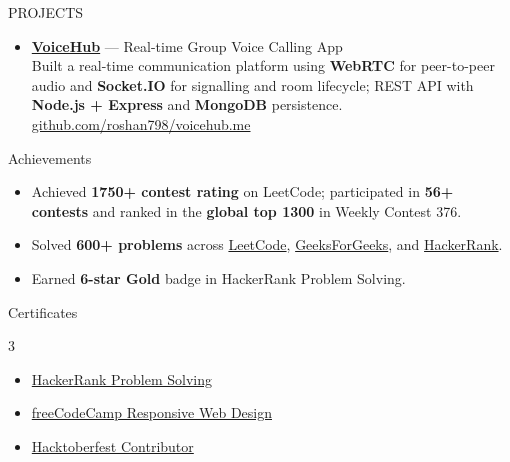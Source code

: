 \documentclass{resume}
\begin{document}
\begin{rSection}{PROJECTS}
\begin{itemize}
\item \href{https://github.com/roshan798/voicehub.me}{\textbf{VoiceHub}}
  --- Real-time Group Voice Calling App\\
  Built a real-time communication platform using \textbf{WebRTC} for
  peer-to-peer audio and \textbf{Socket.IO} for signalling and room lifecycle;
  REST API with \textbf{Node.js + Express} and \textbf{MongoDB} persistence.\\
  \href{https://github.com/roshan798/voicehub.me}{github.com/roshan798/voicehub.me}

\end{itemize}
\end{rSection}


\begin{rSection}{Achievements}
\begin{itemize}
  \item Achieved \textbf{1750+ contest rating} on LeetCode; participated in
        \textbf{56+ contests} and ranked in the \textbf{global top 1300}
        in Weekly Contest 376.
  \item Solved \textbf{600+ problems} across
        \href{https://leetcode.com/u/Roshan_kumar7989/}{LeetCode},
        \href{https://auth.geeksforgeeks.org/user/roshan_sahu/}{GeeksForGeeks}, and
        \href{https://www.hackerrank.com/rsahu7989}{HackerRank}.
  \item Earned \textbf{6-star Gold} badge in HackerRank Problem Solving.
\end{itemize}
\end{rSection}


\begin{rSection}{Certificates}
\begin{multicols}{3}
\begin{itemize}
  \item \href{https://www.hackerrank.com/certificates/73bb80c83be4}{HackerRank Problem Solving}
  \item \href{https://www.freecodecamp.org/certification/Roshan_kumar7989/responsive-web-design}{freeCodeCamp Responsive Web Design}
  \item \href{https://tree-nation.com/certificate/6525e97fbca2d}{Hacktoberfest Contributor}
\end{itemize}
\end{multicols}
\end{rSection}
\end{document}
